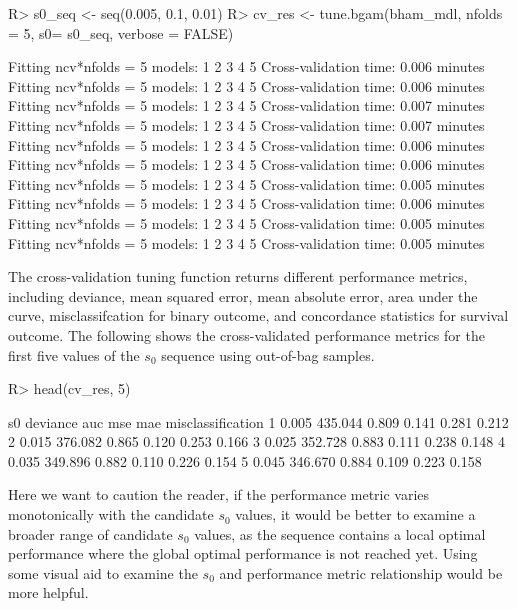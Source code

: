 \documentclass[
]{jss}
\begin{document}
\begin{CodeChunk}
\begin{CodeInput}
R> s0_seq <- seq(0.005, 0.1, 0.01)
R> cv_res <- tune.bgam(bham_mdl, nfolds = 5, s0= s0_seq, verbose = FALSE)
\end{CodeInput}
\begin{CodeOutput}
Fitting ncv*nfolds = 5 models: 
1 2 3 4 5 
 Cross-validation time: 0.006 minutes 
Fitting ncv*nfolds = 5 models: 
1 2 3 4 5 
 Cross-validation time: 0.006 minutes 
Fitting ncv*nfolds = 5 models: 
1 2 3 4 5 
 Cross-validation time: 0.007 minutes 
Fitting ncv*nfolds = 5 models: 
1 2 3 4 5 
 Cross-validation time: 0.007 minutes 
Fitting ncv*nfolds = 5 models: 
1 2 3 4 5 
 Cross-validation time: 0.006 minutes 
Fitting ncv*nfolds = 5 models: 
1 2 3 4 5 
 Cross-validation time: 0.006 minutes 
Fitting ncv*nfolds = 5 models: 
1 2 3 4 5 
 Cross-validation time: 0.005 minutes 
Fitting ncv*nfolds = 5 models: 
1 2 3 4 5 
 Cross-validation time: 0.006 minutes 
Fitting ncv*nfolds = 5 models: 
1 2 3 4 5 
 Cross-validation time: 0.005 minutes 
Fitting ncv*nfolds = 5 models: 
1 2 3 4 5 
 Cross-validation time: 0.005 minutes 
\end{CodeOutput}
\end{CodeChunk}

The cross-validation tuning function returns different performance
metrics, including deviance, mean squared error, mean absolute error,
area under the curve, misclassifcation for binary outcome, and
concordance statistics for survival outcome. The following shows the
cross-validated performance metrics for the first five values of the
\(s_0\) sequence using out-of-bag samples.

\begin{CodeChunk}
\begin{CodeInput}
R> head(cv_res, 5)
\end{CodeInput}
\begin{CodeOutput}
     s0 deviance   auc   mse   mae misclassification
1 0.005  435.044 0.809 0.141 0.281             0.212
2 0.015  376.082 0.865 0.120 0.253             0.166
3 0.025  352.728 0.883 0.111 0.238             0.148
4 0.035  349.896 0.882 0.110 0.226             0.154
5 0.045  346.670 0.884 0.109 0.223             0.158
\end{CodeOutput}
\end{CodeChunk}

Here we want to caution the reader, if the performance metric varies
monotonically with the candidate \(s_0\) values, it would be better to
examine a broader range of candidate \(s_0\) values, as the sequence
contains a local optimal performance where the global optimal
performance is not reached yet. Using some visual aid to examine the
\(s_0\) and performance metric relationship would be more helpful.
\end{document}
